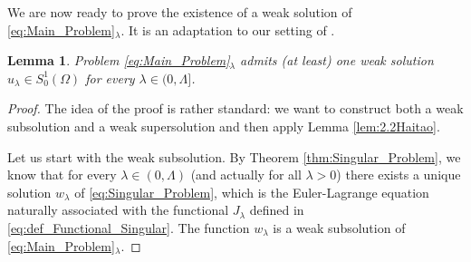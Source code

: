 \documentclass[11pt]{amsart}
\numberwithin{equation}{section} %
\newtheorem{lemma}[teo]{Lemma}
\theoremstyle{definition}
\begin{document}
We are now ready to prove the existence of a weak solution of \eqref{eq:Main_Problem}$_\lambda$. 
It is an adaptation to our setting of \cite[Lemma 2.3]{Haitao}.
\begin{lemma}\label{lem:2.3Haitao}
	Problem \eqref{eq:Main_Problem}$_\lambda$ admits \emph{(}at least\emph{)}
	one weak solution $u_\lambda\in S^{1}_{0}(\Omega)$ for every $\lambda \in (0,\Lambda]$.
\end{lemma}
\begin{proof}
	The idea of the proof is rather standard: we want to construct both a weak subsolution and a weak supersolution and then apply Lemma \ref{lem:2.2Haitao}. 
	
	Let us start with the weak subsolution. 
	By Theorem \ref{thm:Singular_Problem}, we know that for every $\lambda \in (0,\Lambda)$ (and actually for all $\lambda >0$) there exists a unique solution $w_{\lambda}$ of \eqref{eq:Singular_Problem}, which is the Euler-Lagrange equation naturally associated with the functional $J_{\lambda}$ defined in \eqref{eq:def_Functional_Singular}.	The function $w_{\lambda}$ is a weak subsolution of \eqref{eq:Main_Problem}$_\lambda$. 
	

\end{proof}
\end{document}
